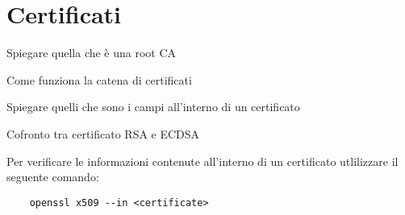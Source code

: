 \documentclass[
10pt, %
a4paper, %
oneside, %
headinclude,footinclude, %
BCOR5mm, %
]{scrartcl}
\begin{document}
\newpage

\appendix

\section{Certificati}

Spiegare quella che è una root CA

Come funziona la catena di certificati

Spiegare quelli che sono i campi all'interno di un certificato

Cofronto tra certificato RSA e ECDSA

Per verificare le informazioni contenute all'interno di un certificato utlilizzare il seguente comando:

\begin{lstlisting}
    openssl x509 --in <certificate>
\end{lstlisting}


\renewcommand{\refname}{\spacedlowsmallcaps{References}} %




\end{document}
